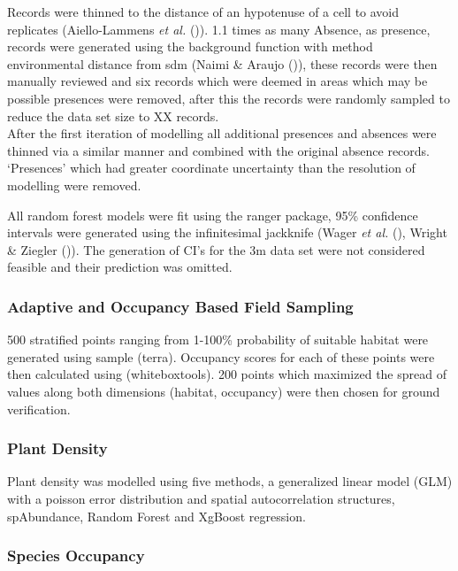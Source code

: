 \documentclass[
]{article}
\begin{document}
Records were thinned to the distance of an hypotenuse of a cell to avoid
replicates (Aiello-Lammens \emph{et al.}
()). 1.1 times as many Absence, as
presence, records were generated using the background function with
method environmental distance from sdm (Naimi \& Araujo
()), these records were then manually
reviewed and six records which were deemed in areas which may be
possible presences were removed, after this the records were randomly
sampled to reduce the data set size to XX records.\\
After the first iteration of modelling all additional presences and
absences were thinned via a similar manner and combined with the
original absence records. `Presences' which had greater coordinate
uncertainty than the resolution of modelling were removed.

All random forest models were fit using the ranger package, 95\%
confidence intervals were generated using the infinitesimal jackknife
(Wager \emph{et al.} (), Wright
\& Ziegler ()). The generation of
CI's for the 3m data set were not considered feasible and their
prediction was omitted.

\subsubsection{Adaptive and Occupancy Based Field
Sampling}\label{adaptive-and-occupancy-based-field-sampling}

500 stratified points ranging from 1-100\% probability of suitable
habitat were generated using sample (terra). Occupancy scores for each
of these points were then calculated using (whiteboxtools). 200 points
which maximized the spread of values along both dimensions (habitat,
occupancy) were then chosen for ground verification.

\subsubsection{Plant Density}\label{plant-density}

Plant density was modelled using five methods, a generalized linear
model (GLM) with a poisson error distribution and spatial
autocorrelation structures, spAbundance, Random Forest and XgBoost
regression.

\subsubsection{Species Occupancy}\label{species-occupancy}
\end{document}
